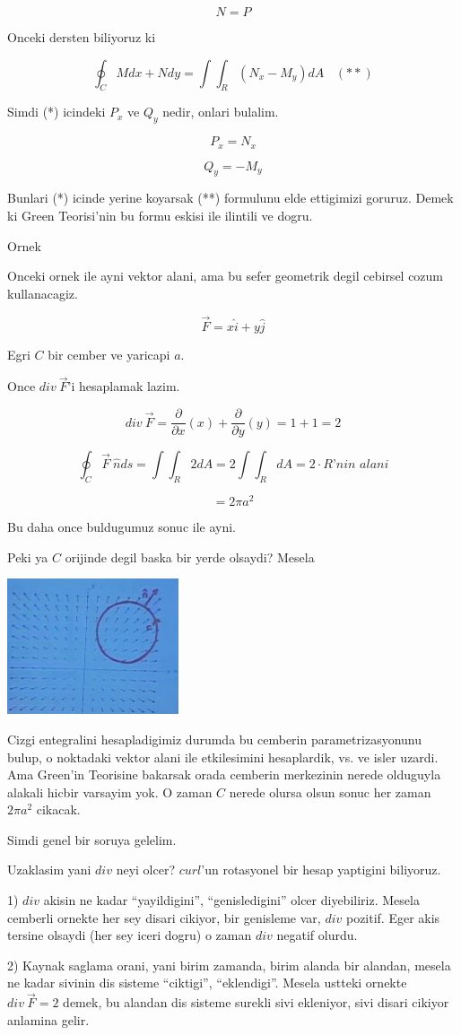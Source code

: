 \documentclass[12pt,fleqn]{article}
\begin{document}
\[ N = P \]

Onceki dersten biliyoruz ki 

\[ \oint_C Mdx + Ndy = \int \int_R (N_x - M_y) dA 
\ \ \ \ (**)
\]

Simdi (*) icindeki $P_x$ ve $Q_y$ nedir, onlari bulalim. 

\[ P_x = N_x \]

\[ Q_y = -M_y \]

Bunlari (*) icinde yerine koyarsak (**) formulunu elde ettigimizi
goruruz. Demek ki Green Teorisi'nin bu formu eskisi ile ilintili ve dogru. 

Ornek

Onceki ornek ile ayni vektor alani, ama bu sefer geometrik degil cebirsel
cozum kullanacagiz. 

\[ \vec{F} = x\hat{i} + y\hat{j} \]

Egri $C$ bir cember ve yaricapi $a$. 

Once $div \ \vec{F}$'i hesaplamak lazim. 

\[ div \ \vec{F}  = 
\frac{\partial }{\partial x}(x) + 
\frac{\partial }{\partial y}(y) = 
1 + 1 = 2 
 \]

\[ \oint_C \vec{F} \ \hat{n} ds = 
\int \int_R 2 dA = 
2 \int \int_R dA = 
2 \cdot \textit{R'nin alani}
 \]

\[ = 2\pi a^2 \]

Bu daha once buldugumuz sonuc ile ayni.

Peki ya $C$ orijinde degil baska bir yerde olsaydi? Mesela 

\includegraphics[height=4cm]{23_9.png}

Cizgi entegralini hesapladigimiz durumda bu cemberin parametrizasyonunu
bulup, o noktadaki vektor alani ile etkilesimini hesaplardik, vs. ve isler
uzardi. Ama Green'in Teorisine bakarsak orada cemberin merkezinin nerede
olduguyla alakali hicbir varsayim yok. O zaman $C$ nerede olursa olsun
sonuc her zaman $2\pi a^2$ cikacak. 

Simdi genel bir soruya gelelim. 

Uzaklasim yani $div$ neyi olcer? $curl$'un rotasyonel bir hesap yaptigini
biliyoruz. 

1) $div$ akisin ne kadar ``yayildigini'', ``genisledigini'' olcer
diyebiliriz. Mesela cemberli ornekte her sey disari cikiyor, bir genisleme
var, $div$ pozitif. Eger akis tersine olsaydi (her sey iceri dogru) o zaman
$div$ negatif olurdu. 

2) Kaynak saglama orani, yani birim zamanda, birim alanda bir alandan,
mesela ne kadar sivinin dis sisteme ``ciktigi'', ``eklendigi''. Mesela
ustteki ornekte $div \ \vec{F} = 2$ demek, bu alandan dis sisteme surekli
sivi ekleniyor, sivi disari cikiyor anlamina gelir. 
\end{document}
